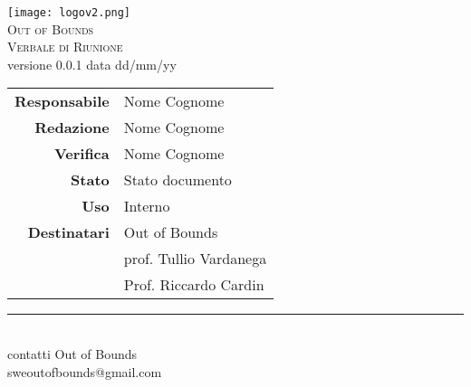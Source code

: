 
\thispagestyle{empty}
\setcounter{page}{0}

\begin{center}





\texttt{[image: logov2.png]}\\
\Large
\textsc{Out of Bounds}\\

\vspace{1cm}
\textsc{Verbale di Riunione}\\
versione 0.0.1 data dd/mm/yy\\

\vspace{4cm}

\begin{tabular}{r|l}
    \textbf{Responsabile}   &  Nome Cognome\\
    \textbf{Redazione}      &  Nome Cognome\\
    \textbf{Verifica}       &  Nome Cognome\\
    \textbf{Stato}          &  Stato documento\\
    \textbf{Uso}            &  Interno\\
    \textbf{Destinatari}    &  Out of Bounds\\
    \textbf{}               &  prof. Tullio Vardanega\\
    \textbf{}               &  Prof. Riccardo Cardin\\
    
\end{tabular}

\vfill


\normalsize
\rule{8cm}{0.1mm}\\
\bigskip
contatti Out of Bounds\\
sweoutofbounds@gmail.com
\end{center}